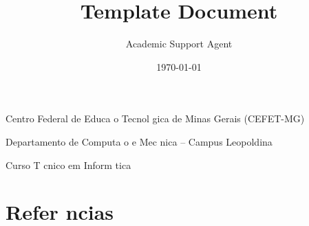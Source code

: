\documentclass{article}
\title{Template Document}
\author{Academic Support Agent}
\date{\today}
\begin{document}
\maketitle

{\centering
        \setlength{\parskip}{0pt}
        Centro Federal de Educa o Tecnol gica de Minas Gerais (CEFET-MG)
        
        \setlength{\parskip}{0pt}
        Departamento de Computa o e Mec nica -- Campus Leopoldina
        
        \setlength{\parskip}{0pt}
        Curso T cnico em Inform tica
        
        \setlength{\parskip}{18pt}
        \textbf{ \thetitle }
        \setlength{\parskip}{12pt}
        
        \theauthor
        
        \setlength{\parskip}{6pt}
        \footnotesize{\emails}
        
    }

    \justifying

    

    

    

    

    

    

    

    

    
    \section{Refer ncias}

    \raggedright
    \printbibliography[heading=none]
\end{document}
